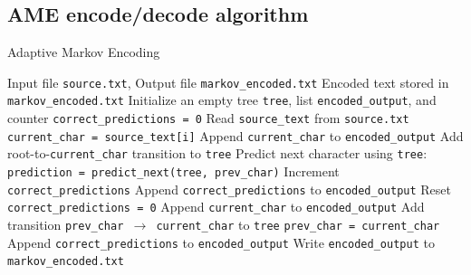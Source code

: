 \documentclass[12pt,twoside]{article}
\begin{document}
\begin{appendices}

\section{AME encode/decode algorithm}
\label{app:AMEalgo}

\begin{algorithm}
    \caption{Adaptive Markov Encoding}
    \label{alg:markov_encode}
    \begin{algorithmic}[1]
    \REQUIRE Input file \texttt{source.txt}, Output file \texttt{markov\_encoded.txt}
    \ENSURE Encoded text stored in \texttt{markov\_encoded.txt}
    \STATE Initialize an empty tree \texttt{tree}, list \texttt{encoded\_output}, and counter \texttt{correct\_predictions = 0}
    \STATE Read \texttt{source\_text} from \texttt{source.txt}
        \STATE \texttt{current\_char = source\_text[i]}
            \STATE Append \texttt{current\_char} to \texttt{encoded\_output}
            \STATE Add root-to-\texttt{current\_char} transition to \texttt{tree}
        \ELSE
            \STATE Predict next character using \texttt{tree}: \texttt{prediction = predict\_next(tree, prev\_char)}
                \STATE Increment \texttt{correct\_predictions}
            \ELSE
                    \STATE Append \texttt{correct\_predictions} to \texttt{encoded\_output}
                    \STATE Reset \texttt{correct\_predictions = 0}
                \ENDIF
                \STATE Append \texttt{current\_char} to \texttt{encoded\_output}
            \ENDIF
            \STATE Add transition \texttt{prev\_char $\to$ current\_char} to \texttt{tree}
        \ENDIF
        \STATE \texttt{prev\_char = current\_char}
    \ENDFOR
        \STATE Append \texttt{correct\_predictions} to \texttt{encoded\_output}
    \ENDIF
    \STATE Write \texttt{encoded\_output} to \texttt{markov\_encoded.txt}
    \end{algorithmic}
\end{algorithm}


\end{appendices}
\end{document}
